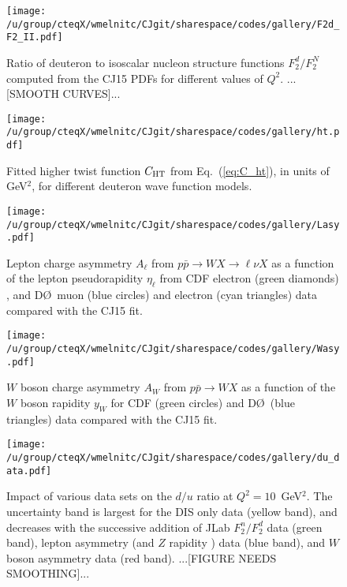 \documentclass[aps,prd,amsmath,preprint]{revtex4}
\begin{document}
\begin{figure}[t]
\texttt{[image: /u/group/cteqX/wmelnitc/CJgit/sharespace/codes/gallery/F2d\_F2\_II.pdf]}
\caption{Ratio of deuteron to isoscalar nucleon structure functions
	$F_2^d/F_2^N$ computed from the CJ15 PDFs for different
	values of $Q^2$.
	{\color{red} ...[SMOOTH CURVES]...}}
\label{fig:F2dN_Q2}
\end{figure}


\begin{figure}[t]
\texttt{[image: /u/group/cteqX/wmelnitc/CJgit/sharespace/codes/gallery/ht.pdf]}
\caption{Fitted higher twist function $C_{\rm HT}$ from
	Eq.~(\ref{eq:C_ht}), in units of GeV$^2$, for different
	deuteron wave function models.}
\label{fig:Cht}
\end{figure}


\begin{figure}[t]
\texttt{[image: /u/group/cteqX/wmelnitc/CJgit/sharespace/codes/gallery/Lasy.pdf]}
\caption{Lepton charge asymmetry $A_{\ell}$ from
	$p\bar p \to W X \to \ell \nu X$ as a function of the
	lepton pseudorapidity $\eta_{\ell}$ from
	CDF electron (green diamonds) \cite{CDF_e}, and
	D\O\ muon (blue circles) \cite{D0_mu} and
	electron (cyan triangles) \cite{D0_e} data
	compared with the CJ15 fit.}
\label{fig:Lasy}
\end{figure} 

  
\begin{figure}[t]
\texttt{[image: /u/group/cteqX/wmelnitc/CJgit/sharespace/codes/gallery/Wasy.pdf]}
\caption{$W$ boson charge asymmetry $A_W$ from $p\bar p \to W X$
	as a function of the $W$ boson rapidity $y_W$ for
	CDF (green circles) \cite{CDF_W} and
	D\O\ (blue triangles) \cite{D0_W} data
	compared with the CJ15 fit.}
\label{fig:Wasy}
\end{figure} 


\begin{figure}[t]
\texttt{[image: /u/group/cteqX/wmelnitc/CJgit/sharespace/codes/gallery/du\_data.pdf]}
\caption{Impact of various data sets on the $d/u$ ratio at
	$Q^2=10$~GeV$^2$. The uncertainty band is largest for the
	  DIS only data (yellow band),
	and decreases with the successive addition of
	  JLab $F_2^n/F_2^d$ \cite{BONuS} data (green band),
	  lepton asymmetry \cite{CDF_e, D0_mu, D0_e}
	(and $Z$ rapidity \cite{CDFZ, D0Z}) data (blue band), and
	  $W$ boson asymmetry data \cite{CDF_W, D0_W} (red band).
	{\color{red}...[FIGURE NEEDS SMOOTHING]...}}
\label{fig:du_data}
\end{figure} 
\end{document}
